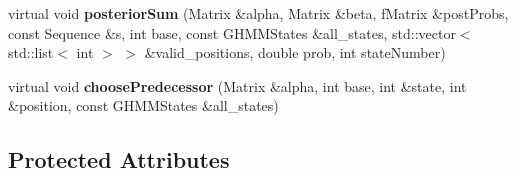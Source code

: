 \begin{DoxyCompactItemize}
\mbox{\label{classtops_1_1GHMMState_a78b48b998f0bd5ffc4dd8f5df87c4ff3}} 
virtual void {\bfseries posterior\+Sum} (Matrix \&alpha, Matrix \&beta, f\+Matrix \&post\+Probs, const Sequence \&s, int base, const G\+H\+M\+M\+States \&all\+\_\+states, std\+::vector$<$ std\+::list$<$ int $>$ $>$ \&valid\+\_\+positions, double prob, int state\+Number)
\item 
\mbox{\label{classtops_1_1GHMMState_ac12a60c18dcd0b173fde9833a3dac96a}} 
virtual void {\bfseries choose\+Predecessor} (Matrix \&alpha, int base, int \&state, int \&position, const G\+H\+M\+M\+States \&all\+\_\+states)
\end{DoxyCompactItemize}
\subsection*{Protected Attributes}
